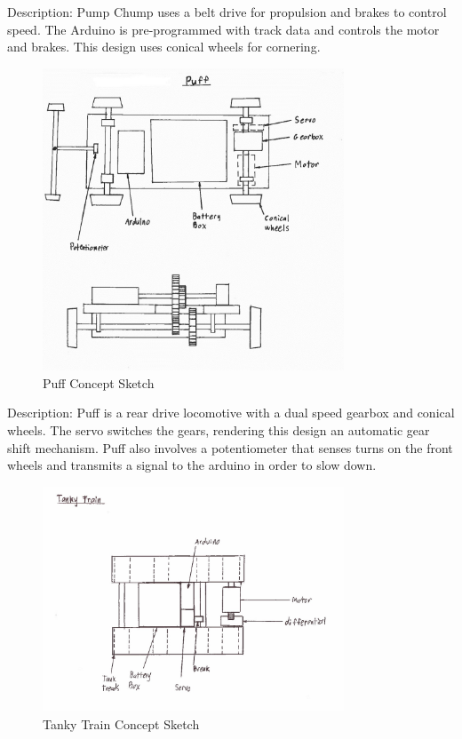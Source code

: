\documentclass[class=../report, crop=false]{standalone}
\begin{document}
Description: Pump Chump uses a belt drive for propulsion and brakes to control speed.
The Arduino is pre-programmed with track data and controls the motor and brakes.
This design uses conical wheels for cornering.
\clearpage

\begin{figure}[H]
	\centering
	\includegraphics[width=0.8\textwidth]{../../res/img/puff}
	\caption{Puff Concept Sketch}
	\label{app/fig:puff}
\end{figure}

Description: Puff is a rear drive locomotive with a dual speed gearbox and conical wheels.
The servo switches the gears, rendering this design  an automatic gear shift mechanism.
Puff also involves a potentiometer that senses turns on the front wheels and transmits a signal to the arduino in order to slow down.
\clearpage

\begin{figure}[H]
	\centering
	\includegraphics[width=0.8\textwidth]{../../res/img/tankytrain}
	\caption{Tanky Train Concept Sketch}
	\label{app/fig:tankytrain}
\end{figure}
\end{document}
